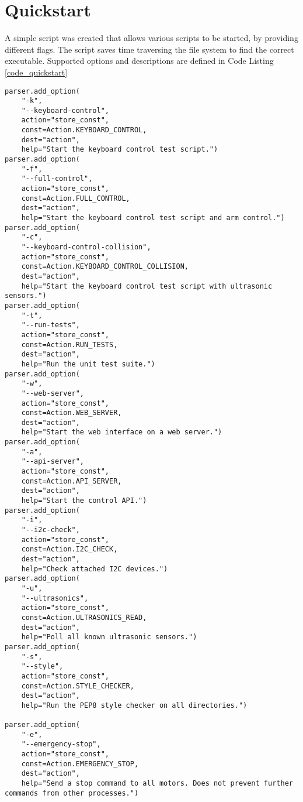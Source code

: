 \section{Quickstart}
A simple script was created that allows various scripts to be started, by providing different flags. The script saves time traversing the file system to find the correct executable.
\newline
Supported options and descriptions are defined in Code Listing \ref{code_quickstart}
\begin{lstlisting}[style=custompython,label=code_quickstart]
parser.add_option(
    "-k",
    "--keyboard-control",
    action="store_const",
    const=Action.KEYBOARD_CONTROL,
    dest="action",
    help="Start the keyboard control test script.")
parser.add_option(
    "-f",
    "--full-control",
    action="store_const",
    const=Action.FULL_CONTROL,
    dest="action",
    help="Start the keyboard control test script and arm control.")
parser.add_option(
    "-c",
    "--keyboard-control-collision",
    action="store_const",
    const=Action.KEYBOARD_CONTROL_COLLISION,
    dest="action",
    help="Start the keyboard control test script with ultrasonic sensors.")
parser.add_option(
    "-t",
    "--run-tests",
    action="store_const",
    const=Action.RUN_TESTS,
    dest="action",
    help="Run the unit test suite.")
parser.add_option(
    "-w",
    "--web-server",
    action="store_const",
    const=Action.WEB_SERVER,
    dest="action",
    help="Start the web interface on a web server.")
parser.add_option(
    "-a",
    "--api-server",
    action="store_const",
    const=Action.API_SERVER,
    dest="action",
    help="Start the control API.")
parser.add_option(
    "-i",
    "--i2c-check",
    action="store_const",
    const=Action.I2C_CHECK,
    dest="action",
    help="Check attached I2C devices.")
parser.add_option(
    "-u",
    "--ultrasonics",
    action="store_const",
    const=Action.ULTRASONICS_READ,
    dest="action",
    help="Poll all known ultrasonic sensors.")
parser.add_option(
    "-s",
    "--style",
    action="store_const",
    const=Action.STYLE_CHECKER,
    dest="action",
    help="Run the PEP8 style checker on all directories.")

parser.add_option(
    "-e",
    "--emergency-stop",
    action="store_const",
    const=Action.EMERGENCY_STOP,
    dest="action",
    help="Send a stop command to all motors. Does not prevent further commands from other processes.")
\end{lstlisting}
